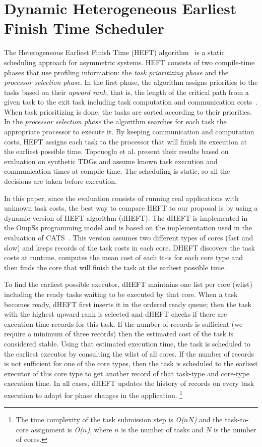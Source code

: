 \section{Dynamic Heterogeneous Earliest Finish Time Scheduler}
\label{sec.scheduling.heft}
The Heterogeneous Earliest Finish Time (HEFT) algorithm~\cite{HEFT} is a static scheduling approach for asymmetric systems.
HEFT consists of two compile-time phases that use profiling information: the \textit{task prioritizing phase} and the \textit{processor selection phase}.
In the first phase, the algorithm assigns priorities to the tasks based on their \textit{upward rank}, that is, the length of the critical path from a given task to the exit task including task computation and communication costs~\cite{HEFT}.
When task prioritizing is done, the tasks are sorted according to their priorities.
In the \textit{processor selection phase} the algorithm searches for each task the appropriate processor to execute it.
By keeping communication and computation costs, HEFT assigns each task to the processor that will finish its execution at the earliest possible time.
Topcuoglu et al. \cite{HEFT} present their results based on evaluation on synthetic TDGs and assume known task execution and communication times at compile time.
The scheduling is static, so all the decisions are taken before execution.

In this paper, since the evaluation consists of running real applications with unknown task costs, the best way to compare HEFT to our proposal is by using a dynamic version of HEFT algorithm (dHEFT).
The dHEFT is implemented in the OmpSs programming model and is based on the implementation used in the evaluation of CATS~\cite{Chronaki:ICS2015}.
This version assumes two different types of cores (fast and slow) and keeps records of the task costs in each core.
DHEFT discovers the task costs at runtime, computes the mean cost of each tt-is for each core type and then finds the core that will finish the task at the earliest possible time.

To find the earliest possible executor, dHEFT maintains
one list per core (wlist) including the ready tasks waiting
to be executed by that core. 
When a task becomes ready, dHEFT first inserts it in the ordered ready queue; then the task with the highest upward rank is selected and dHEFT checks if there are execution time records for this task. 
If the number of records is sufficient (we require a minimum of three records)
then the estimated cost of the task is considered stable. 
Using that estimated execution time, the task
is scheduled to the earliest executor by consulting the wlist
of all cores. If the number of records is not sufficient
for one of the core types, then the task is scheduled to the
earliest executor of this core type to get another record of
that task-type and core-type execution time. In all cases,
dHEFT updates the history of records on every task execution to adapt for phase changes in the application. \footnote{The time complexity of the task submission step is \textit{O($nN$)} and the task-to-core assignment is \textit{O($n$)}, where \textit{$n$} is the number of tasks and \textit{$N$} is the number of cores.}


